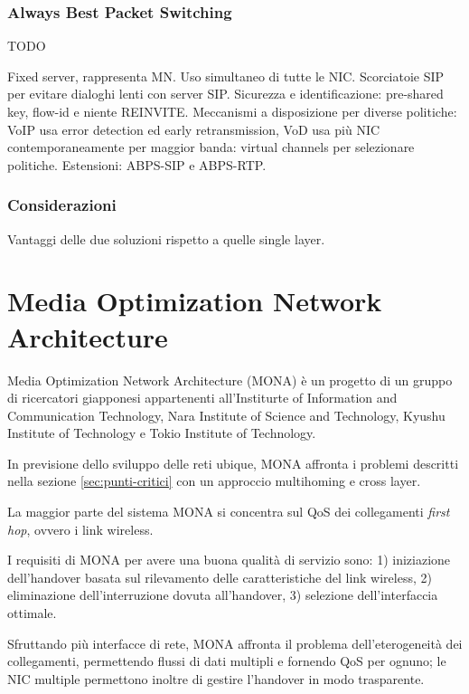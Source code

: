 \documentclass[12pt,a4paper,openright,twoside]{book}
\begin{document}
\subsection{Always Best Packet Switching}

TODO

Fixed server, rappresenta MN. Uso simultaneo di tutte le
NIC. Scorciatoie SIP per evitare dialoghi lenti con server
SIP. Sicurezza e identificazione: pre-shared key, flow-id e niente
REINVITE. Meccanismi a disposizione per diverse politiche: VoIP usa
error detection ed early retransmission, VoD usa più NIC
contemporaneamente per maggior banda: virtual channels per selezionare
politiche. Estensioni: ABPS-SIP e ABPS-RTP.


\subsection{Considerazioni}
Vantaggi delle due soluzioni rispetto a quelle single layer.

\clearpage{\pagestyle{empty}\cleardoublepage}


\chapter{Media Optimization Network Architecture}

Media Optimization Network Architecture (MONA) è un progetto di un
gruppo di ricercatori giapponesi appartenenti all'Institurte of
Information and Communication Technology, Nara Institute of Science
and Technology, Kyushu Institute of Technology e Tokio Institute of
Technology.

In previsione dello sviluppo delle reti ubique, MONA affronta i
problemi descritti nella sezione \ref{sec:punti-critici} con un
approccio multihoming e cross layer.

La maggior parte del sistema MONA si concentra sul QoS dei
collegamenti \emph{first hop}, ovvero i link wireless.

I requisiti di MONA per avere una buona qualità di servizio sono:
1) iniziazione dell'handover basata sul rilevamento delle
caratteristiche del link wireless, 2) eliminazione dell'interruzione
dovuta all'handover, 3) selezione dell'interfaccia ottimale.

Sfruttando più interfacce di rete, MONA affronta il problema
dell'eterogeneità dei collegamenti, permettendo flussi di dati
multipli e fornendo QoS per ognuno; le NIC multiple permettono inoltre
di gestire l'handover in modo trasparente.
\end{document}
